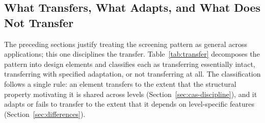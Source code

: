 \documentclass[12pt, letterpaper]{article}
\begin{document}
\subsection{What Transfers, What Adapts, and What Does Not Transfer}
\label{sec:transfer-analysis}

The preceding sections justify treating the screening pattern as general across applications; this one disciplines the transfer. Table~\ref{tab:transfer} decomposes the pattern into design elements and classifies each as transferring essentially intact, transferring with specified adaptation, or not transferring at all. The classification follows a single rule: an element transfers to the extent that the structural property motivating it is shared across levels (Section~\ref{sec:cas-discipline}), and it adapts or fails to transfer to the extent that it depends on level-specific features (Section~\ref{sec:differences}).
\end{document}
